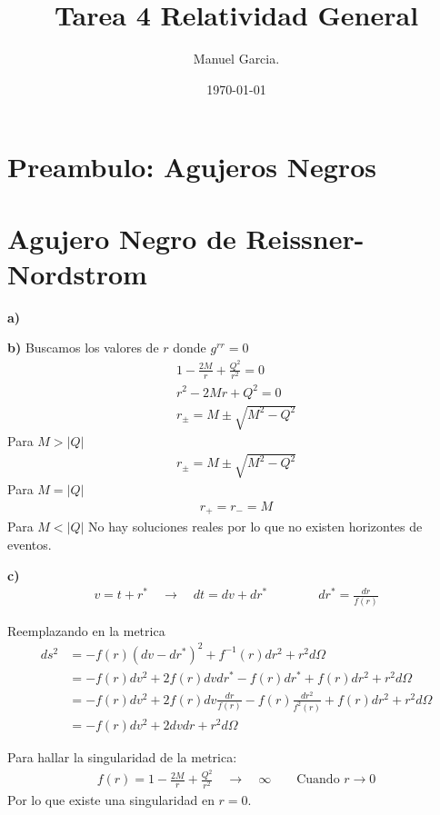 \documentclass{article}
\title{Tarea 4 Relatividad General }
\author{Manuel Garcia.}
\date{\today}
\begin{document}
\maketitle

\section{Preambulo: Agujeros Negros}


\section{Agujero Negro de Reissner-Nordstrom}

\hfill

\textbf{a) }

\textbf{b) } Buscamos los valores de $ r  $ donde $ g ^ {rr } = 0  $
\begin{gather*}
  1 - \frac{2M }{r} + \frac{Q^2 }{r^2 } = 0 \\
  r^2 - 2Mr + Q^2 = 0 \\
  r _{\pm } = M \pm \sqrt{M^2 - Q^2 } 
\end{gather*}
Para $ M > \left|Q \right| $
\begin{gather*}
  r _{\pm } = M \pm \sqrt{M^2 - Q^2 }  
\end{gather*}
Para $ M = \left|Q \right| $
\begin{gather*}
  r _{+  } = r _{-   } = M 
\end{gather*}
Para $ M < \left|Q \right| $ No hay soluciones reales por lo que no existen horizontes de eventos.


\textbf{c) } 
\begin{gather*}
  v= t + r^* \quad \rightarrow \quad dt = dv + dr^* \qquad \qquad dr^* = \frac{dr }{f(r)} 
\end{gather*}

Reemplazando en la metrica 
\begin{align*}
  ds^2 &= - f(r) (dv-dr^*)^2 + f^{-1}\left(r\right) dr^2 + r^2 d\Omega \\
       &= - f(r) dv^2 + 2 f(r) dv dr^* - f(r) dr^* + f(r) dr^2 + r^2 d\Omega \\
       &= - f(r) dv^2 + 2 f(r) dv \frac{dr }{f(r) } - f(r) \frac{dr^2 }{f^2(r) } + f(r) dr^2 + r^2 d\Omega \\
       &= - f(r) dv^2 + 2 dvdr + r^2 d\Omega
\end{align*}

Para hallar la singularidad de la metrica: 
\begin{gather*}
  f(r) = 1 - \frac{2M }{r } + \frac{Q^2 }{r^2 } \quad \rightarrow \quad \infty \qquad \text{Cuando } r \rightarrow 0  
\end{gather*}
Por lo que existe una singularidad en $ r= 0 $.
\end{document}
